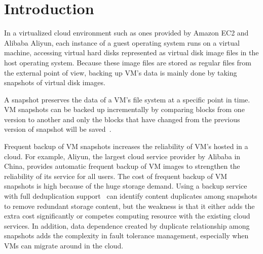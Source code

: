 \section{Introduction}


In a virtualized cloud environment such as ones provided by Amazon EC2\cite{AmazonEC2} and Alibaba Aliyun\cite{Aliyun},
each instance of a guest operating system runs on a virtual machine, accessing
virtual hard disks represented as virtual disk image files in the host operating system.
Because these image files are stored as regular files from the external point of view,
backing up VM's data is mainly done by taking snapshots of virtual disk images.

A snapshot preserves the data of a VM's file system at a specific point in time. 
VM snapshots can be  backed up  incrementally by comparing blocks from one version to another 
and only the blocks that have changed from the previous version of snapshot will be saved~\cite{Clements2009,Vrable2009}. 

Frequent  backup of VM snapshots increases  the reliability of VM's hosted in a cloud.
For example, Aliyun, the largest cloud service provider by Alibaba in China, 
provides automatic frequent backup of VM images to strengthen the reliability of its service for all users.
The cost of frequent backup of VM snapshots is  high because of the huge storage demand.
Using a backup service with full deduplication support~\cite{venti02,bottleneck08}
can identify content duplicates among snapshots to remove redundant storage content,  but the weakness is that it
either adds the  extra cost significantly or competes computing resource with the existing cloud services.
In addition, data dependence created by duplicate relationship among snapshots
adds the complexity in fault tolerance management, especially when  VMs can migrate around in the cloud. 

